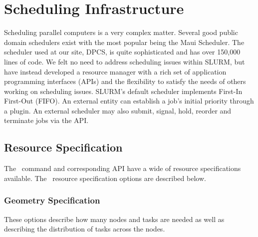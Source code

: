 \section{Scheduling Infrastructure}

Scheduling parallel computers is a very complex matter.  
Several good public domain schedulers exist with the most 
popular being the Maui Scheduler\cite{Jackson2001,Maui2002}. 
The scheduler used at our site, DPCS\cite{DPCS2002}, is quite 
sophisticated and has over 150,000 lines of code. 
We felt no need to address scheduling issues within SLURM, but 
have instead developed a resource manager with a rich set of 
application programming interfaces (APIs) and the flexibility 
to satisfy the needs of others working on scheduling issues.  
SLURM's default scheduler implements First-In First-Out (FIFO). 
An external entity can establish a job's initial priority 
through a plugin.
An external scheduler may also submit, signal, hold, reorder and 
terminate jobs via the API.

\subsection{Resource Specification}

The \srun\ command and corresponding API have a wide of resource 
specifications available. The \srun\ resource specification options 
are described below.

\subsubsection{Geometry Specification}

These options describe how many nodes and tasks are needed as
well as describing the distribution of tasks across the nodes.

